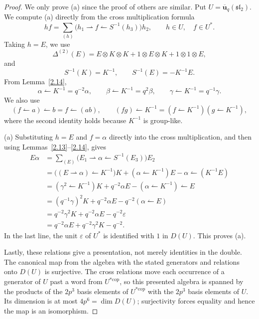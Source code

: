 \documentclass[10pt,oneside]{amsart}
\newcommand{\uq}{\mathbf{\overline{u}}_q(\mathfrak{sl_2})}
\newcommand{\cop}{\mathrm{cop}}
\theoremstyle{definition}
\begin{document}
\begin{proof} We only prove \textup{(a)} since the proof of others are similar.
Put $U=\uq$. We compute \textup{(a)} directly from the cross
multiplication formula
\[
 hf=\sum_{(h)}\bigl(h_1\rightharpoonup f
                \leftharpoonup S^{-1}(h_3)\bigr)h_2,
 \qquad h\in U,\quad f\in U^*.
\]
Taking $h=E$, we use\[
 \Delta^{(2)}(E)=E\otimes K\otimes K
       +1\otimes E\otimes K+1\otimes1\otimes E,
\]
and
\[
 S^{-1}(K)=K^{-1},\qquad S^{-1}(E)=-K^{-1}E.
\]
From Lemma~\ref{2.14},
\[
 \alpha\leftharpoonup K^{-1}=q^{-2}\alpha,\qquad
 \beta\leftharpoonup K^{-1}=q^2\beta,\qquad
 \gamma\leftharpoonup K^{-1}=q^{-1}\gamma.
\]
We also use
\[
 (f\leftharpoonup a)\leftharpoonup b=f\leftharpoonup(ab),
 \qquad
 (fg)\leftharpoonup K^{-1}
 =(f\leftharpoonup K^{-1})(g\leftharpoonup K^{-1}),
\]
where the second identity holds because $K^{-1}$ is group-like.

(a)
Substituting $h=E$ and $f=\alpha$ directly into the cross multiplication,
and then using Lemmas~\ref{2.13}--\ref{2.14}, gives
\begin{align*}
 E\alpha
 &=\sum_{(E)}\bigl(E_1\rightharpoonup\alpha
                      \leftharpoonup S^{-1}(E_3)\bigr)E_2\\
 &=\bigl((E\rightharpoonup\alpha)\leftharpoonup K^{-1}\bigr)K
   +(\alpha\leftharpoonup K^{-1})E
   -\alpha\leftharpoonup(K^{-1}E)\\
 &=(\gamma^2\leftharpoonup K^{-1})K
   +q^{-2}\alpha E
   -(\alpha\leftharpoonup K^{-1})\leftharpoonup E\\
 &=(q^{-1}\gamma)^2K+q^{-2}\alpha E
   -q^{-2}(\alpha\leftharpoonup E)\\
 &=q^{-2}\gamma^2K+q^{-2}\alpha E-q^{-2}\varepsilon\\
 &=q^{-2}\alpha E+q^{-2}\gamma^2K-q^{-2}.
\end{align*}
In the last line, the unit $\varepsilon$ of $U^*$ is identified with
$1$ in $D(U)$. This proves \textup{(a)}.

Lastly, these relations give a presentation, not merely identities in the double. The canonical map from the algebra with the stated generators and relations onto $D(U)$ is surjective. The cross relations move each occurrence of a generator of $U$ past a word from $U^{*\cop}$, so this presented algebra is spanned by the products of the $2p^3$ basis elements of $U^{*\cop}$ with the $2p^3$ basis elements of $U$. Its dimension is at most $4p^6=\dim D(U)$; surjectivity forces equality and hence the map is an isomorphism.
\end{proof}
\end{document}
